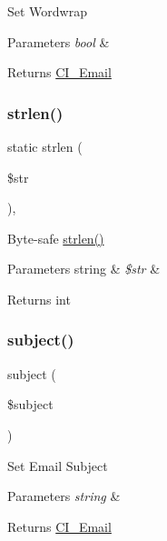 Set Wordwrap


\begin{DoxyParams}{Parameters}
{\em bool} & \\
\hline
\end{DoxyParams}
\begin{DoxyReturn}{Returns}
\mbox{\hyperlink{class_c_i___email}{C\+I\+\_\+\+Email}} 
\end{DoxyReturn}
\mbox{\label{class_c_i___email_a4c29a687d4ed62c26a10e41d98930d5f}} 
\subsubsection{\texorpdfstring{strlen()}{strlen()}}
{\footnotesize\ttfamily static strlen (\begin{DoxyParamCaption}\item[{}]{\$str }\end{DoxyParamCaption})\hspace{0.3cm}{\ttfamily [static]}, {\ttfamily [protected]}}

Byte-\/safe \mbox{\hyperlink{class_c_i___email_a4c29a687d4ed62c26a10e41d98930d5f}{strlen()}}


\begin{DoxyParams}[1]{Parameters}
string & {\em \$str} & \\
\hline
\end{DoxyParams}
\begin{DoxyReturn}{Returns}
int 
\end{DoxyReturn}
\mbox{\label{class_c_i___email_aaa61b3aaa6cc4c90e26686e4bf41587a}} 
\subsubsection{\texorpdfstring{subject()}{subject()}}
{\footnotesize\ttfamily subject (\begin{DoxyParamCaption}\item[{}]{\$subject }\end{DoxyParamCaption})}

Set Email Subject


\begin{DoxyParams}{Parameters}
{\em string} & \\
\hline
\end{DoxyParams}
\begin{DoxyReturn}{Returns}
\mbox{\hyperlink{class_c_i___email}{C\+I\+\_\+\+Email}} 
\end{DoxyReturn}
\mbox{\label{class_c_i___email_a101caef57ef0b165da5747e2c2e6c9dc}} 
